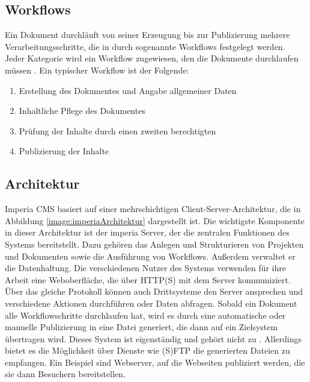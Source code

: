     \subsection{Workflows}
        Ein Dokument durchläuft von seiner Erzeugung bis zur
        Publizierung mehrere Verarbeitungsschritte,
        die in {\imperia} durch sogenannte Workflows festgelegt werden.
        Jeder Kategorie wird ein Workflow zugewiesen,
        den die Dokumente durchlaufen müssen
        \cite[Kapitel 1.1.5]{imperia:ecmd}.
        Ein typischer Workflow \cite[Kapitel 1.1]{imperia:ecmd} ist der Folgende:

        \begin{enumerate}
            \item Erstellung des Dokumentes und Angabe allgemeiner Daten
            \item Inhaltliche Pflege des Dokumentes
            \item Prüfung der Inhalte durch einen zweiten berechtigten \editor
            \item Publizierung der Inhalte
        \end{enumerate}

    \subsection{Architektur}
        \label{section:imperiaArch}
        Imperia CMS basiert auf einer mehrschichtigen Client-Server-Architektur,
        die in Abbildung \ref{image:imperiaArchitektur} dargestellt ist.
        Die wichtigste Komponente in dieser Architektur ist der imperia Server,
        der die zentralen Funktionen des Systems bereitstellt.
        Dazu gehören das Anlegen und Strukturieren von Projekten
        und Dokumenten sowie die Ausführung von Workflows.
        Außerdem verwaltet er die Datenhaltung.
        Die verschiedenen Nutzer des Systems
        verwenden für ihre Arbeit eine Weboberfläche,
        die über HTTP(S) mit dem Server kommuniziert.
        Über das gleiche Protokoll können auch Drittsysteme den Server
        ansprechen und verschiedene Aktionen durchführen oder Daten abfragen.
        Sobald ein Dokument alle Workflowschritte durchlaufen hat,
        wird es durch eine automatische oder manuelle Publizierung
        in eine Datei generiert, die dann auf ein Zielsystem übertragen wird.
        Dieses System ist eigenständig und gehört nicht zu {\imperia}.
        Allerdings bietet es die Möglichkeit über Dienste wie (S)FTP
        die generierten Dateien zu empfangen.
        Ein Beispiel sind Webserver, auf die Webseiten publiziert werden,
        die sie dann Besuchern bereitstellen.

